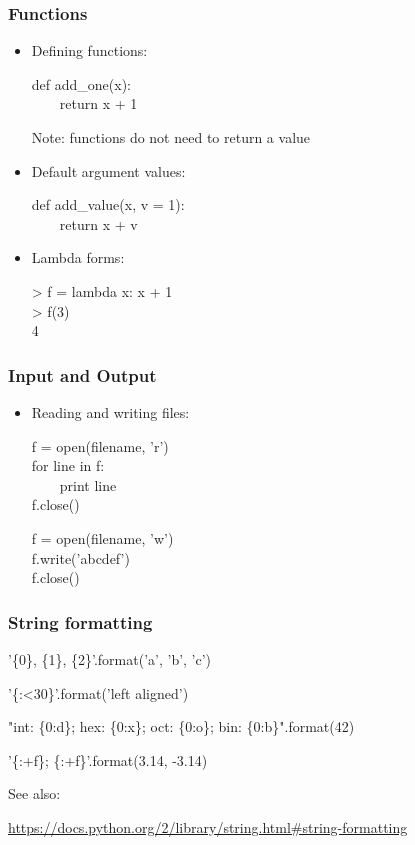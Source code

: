 \documentclass{beamer}
\newenvironment{code}{%
  \begin{exampleblock}{}
      \ttfamily
    }{%
  \end{exampleblock}
}
\begin{document}
\begin{frame}
    \frametitle{Functions}
    \begin{itemize}
    \item Defining functions:
        \begin{code}
            def add\_one(x):\\
            ~~~~return x + 1
        \end{code}
        Note: functions do not need to return a value
    \item Default argument values:
        \begin{code}
            def add\_value(x, v = 1):\\
            ~~~~return x + v
        \end{code}
    \item Lambda forms:
        \begin{code}
            > f = lambda x: x + 1\\
            > f(3)\\
            4
        \end{code}
    \end{itemize}
\end{frame}

\begin{frame}
    \frametitle{Input and Output}
    \begin{itemize}
    \item Reading and writing files:
        \begin{code}
            f = open(filename, 'r')\\
            for line in f:\\
            ~~~~print line\\
            f.close()
        \end{code}
        \begin{code}
            f = open(filename, 'w')\\
            f.write('abcdef')\\
            f.close()
        \end{code}
    \end{itemize}
\end{frame}

\begin{frame}
    \frametitle{String formatting}
    \begin{code}
        '\{0\}, \{1\}, \{2\}'.format('a', 'b', 'c')
    \end{code}
    \begin{code}
        '\{:<30\}'.format('left aligned')
    \end{code}
    \begin{code}
        "int: \{0:d\};  hex: \{0:x\};  oct: \{0:o\};  bin: \{0:b\}".format(42)
    \end{code}
    \begin{code}
        '\{:+f\}; \{:+f\}'.format(3.14, -3.14)
    \end{code}
    \vfill
    See also:
    \begin{block}{}
        \url{https://docs.python.org/2/library/string.html\#string-formatting}
    \end{block}
\end{frame}
\end{document}
